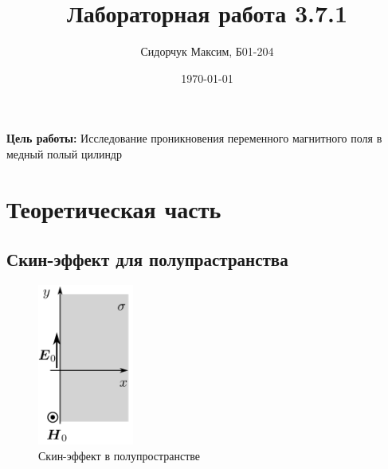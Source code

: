 \documentclass[a4paper]{article}
\date{\today}
\title{Лабораторная работа 3.7.1}
\author{Сидорчук Максим, Б01-204}
\begin{document}
\maketitle


\textbf{Цель работы:} Исследование проникновения переменного магнитного поля в медный полый цилиндр

\section{Теоретическая часть}
\subsection{Скин-эффект для полупрастранства}
\vspace{1cm}
\begin{figure}
    \begin{center}
        \includegraphics[width=0.28\textwidth]{poluprostranstvo}
    \end{center}
    \caption{Скин-эффект в полупространстве}\label{fig:poluprostranstvo}
\end{figure}
\end{document}
